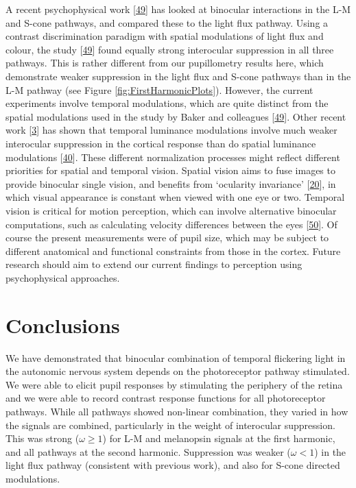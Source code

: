 \documentclass[
]{article}
\begin{document}
A recent psychophysical work {[}\protect\hyperlink{ref-Baker2024}{49}{]} has looked at binocular interactions in the L-M and S-cone pathways, and compared these to the light flux pathway. Using a contrast discrimination paradigm with spatial modulations of light flux and colour, the study {[}\protect\hyperlink{ref-Baker2024}{49}{]} found equally strong interocular suppression in all three pathways. This is rather different from our pupillometry results here, which demonstrate weaker suppression in the light flux and S-cone pathways than in the L-M pathway (see Figure \ref{fig:FirstHarmonicPlots}). However, the current experiments involve temporal modulations, which are quite distinct from the spatial modulations used in the study by Baker and colleagues {[}\protect\hyperlink{ref-Baker2024}{49}{]}. Other recent work {[}\protect\hyperlink{ref-Segala2023}{3}{]} has shown that temporal luminance modulations involve much weaker interocular suppression in the cortical response than do spatial luminance modulations {[}\protect\hyperlink{ref-Baker2017}{40}{]}. These different normalization processes might reflect different priorities for spatial and temporal vision. Spatial vision aims to fuse images to provide binocular single vision, and benefits from `ocularity invariance' {[}\protect\hyperlink{ref-Baker2007}{20}{]}, in which visual appearance is constant when viewed with one eye or two. Temporal vision is critical for motion perception, which can involve alternative binocular computations, such as calculating velocity differences between the eyes {[}\protect\hyperlink{ref-Kaestner2019}{50}{]}. Of course the present measurements were of pupil size, which may be subject to different anatomical and functional constraints from those in the cortex. Future research should aim to extend our current findings to perception using psychophysical approaches.

\hypertarget{conclusions}{%
\section{Conclusions}\label{conclusions}}

We have demonstrated that binocular combination of temporal flickering light in the autonomic nervous system depends on the photoreceptor pathway stimulated. We were able to elicit pupil responses by stimulating the periphery of the retina and we were able to record contrast response functions for all photoreceptor pathways. While all pathways showed non-linear combination, they varied in how the signals are combined, particularly in the weight of interocular suppression. This was strong (\(\omega \ge 1\)) for L-M and melanopsin signals at the first harmonic, and all pathways at the second harmonic. Suppression was weaker (\(\omega < 1\)) in the light flux pathway (consistent with previous work), and also for S-cone directed modulations.
\end{document}
